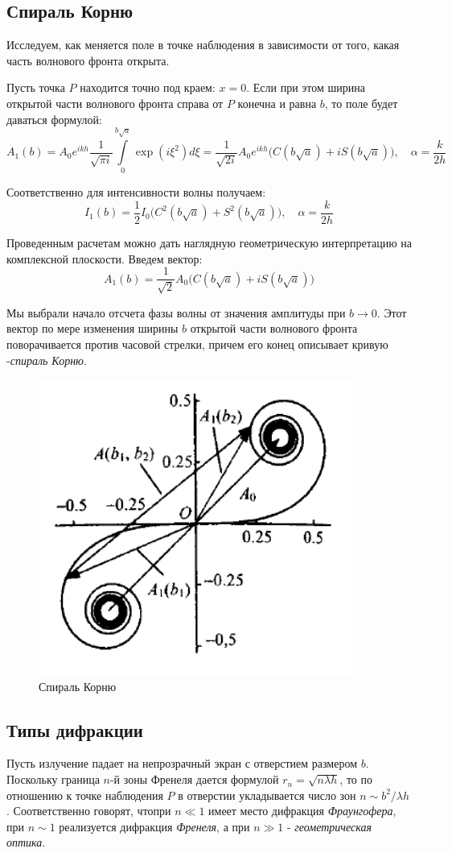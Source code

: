 \documentclass[a4paper,12pt]{article}
\begin{document}
\subsection{Спираль Корню}

Исследуем, как меняется поле в точке наблюдения в зависимости от того, какая часть волнового фронта открыта.

Пусть точка $P$ находится точно под краем: $x=0$. Если при этом ширина открытой части волнового фронта справа от $P$ конечна и равна $b$, то поле будет даваться формулой:
$$
A_1(b)=A_0e^{ikh}\frac{1}{\sqrt{\pi i}}\int\limits_0^{b\sqrt{a}}\exp{(i\xi^2)}d\xi=\frac{1}{\sqrt{2i}}A_0e^{ikh}\Big(C(b\sqrt{a})+iS(b\sqrt{a})\Big), \quad \alpha=\frac{k}{2h}
$$

Соответственно для интенсивности волны получаем:
$$
I_1(b)=\frac{1}{2}I_0\Big(C^2(b\sqrt{a})+S^2(b\sqrt{a})\Big), \quad \alpha=\frac{k}{2h}
$$

Проведенным расчетам можно дать наглядную геометрическую интерпретацию на комплексной плоскости. Введем вектор:
$$
A_1(b)=\frac{1}{\sqrt{2}}A_0\Big(C(b\sqrt{a})+iS(b\sqrt{a})\Big)
$$

Мы выбрали начало отсчета фазы волны от значения амплитуды при $b\rightarrow 0$. Этот вектор по мере изменения ширины $b$ открытой части волнового фронта поворачивается против часовой стрелки, причем его конец описывает кривую -\textit{спираль Корню}.

\begin{figure}[h]
\centering
\includegraphics[width=0.4\linewidth]{img11.png}
\caption{Спираль Корню}
\label{img11}
\end{figure}

\subsection{Типы дифракции}

Пусть излучение падает на непрозрачный экран с отверстием размером $b$. Поскольку граница $n$-й зоны Френеля дается формулой $r_n=\sqrt{n\lambda h}$, то по отношению к точке наблюдения $P$ в отверстии укладывается число зон $n\sim b^2/\lambda h$. Соответственно говорят, чтопри $n\ll 1$ имеет место дифракция \textit{Фраунгофера}, при $n\sim 1$ реализуется дифракция \textit{Френеля}, а при $n\gg 1$ - \textit{геометрическая оптика}.
\end{document}
